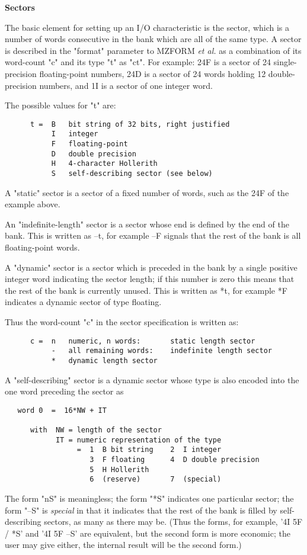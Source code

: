 {\large\bf Sectors}

The basic element for setting up an I/O characteristic is the sector,
which is a number of words consecutive in the bank which are
all of the same type.
A sector is described in the "format" parameter to MZFORM {\it et al.}
as a combination of its word-count "c" and its type "t" as  "ct".
For example:
24F is a sector of 24 single-precision floating-point numbers,
24D is a sector of 24 words holding 12 double-precision numbers,
and  1I is a sector of one integer word.

The possible values for "t" are:
\begin{verbatim}
      t =  B   bit string of 32 bits, right justified
           I   integer
           F   floating-point
           D   double precision
           H   4-character Hollerith
           S   self-describing sector (see below)
\end{verbatim} 
A "static" sector is a sector of a fixed number of words,
such as the 24F of the example above.

An "indefinite-length" sector is a sector whose end is defined
by the end of the bank.
This is written as  --t, for example  --F  signals that the rest
of the bank is all floating-point words.

A "dynamic" sector is a sector which is preceded in the bank
by a single positive integer word indicating the sector length;
if this number is zero this means that the rest of
the bank is currently unused.
This is written as  *t, for example  *F  indicates
a dynamic sector of type floating.


Thus the word-count "c" in the sector specification is written as:
\begin{verbatim}
      c =  n   numeric, n words:       static length sector
           -   all remaining words:    indefinite length sector
           *   dynamic length sector
\end{verbatim} 
A "self-describing" sector is a dynamic sector whose type
is also encoded into the one word preceding the sector as
\begin{verbatim}
   word 0  =  16*NW + IT

      with  NW = length of the sector
            IT = numeric representation of the type
                 =  1  B bit string    2  I integer
                    3  F floating      4  D double precision
                    5  H Hollerith
                    6  (reserve)       7  (special)
\end{verbatim} 
The form "nS" is meaningless;
the form "*S" indicates one particular sector;
the form "--S" is {\em special} in that it indicates
that the rest of the bank is filled by self-describing sectors,
as many as there may be.
(Thus the forms, for example, '4I 5F / *S' and '4I 5F --S' are
equivalent, but the second form is more economic;
the user may give either, the internal result will be the
second form.)

